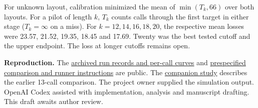 \documentclass[11pt,a4paper]{article}
\begin{document}
For unknown layout, calibration minimized the mean of $\min(T_k,66)$ over both
layouts. For a pilot of length $k$, $T_k$ counts calls through the first
target in either stage ($T_k=\infty$ on a miss). For $k=12,14,16,18,20$, the respective
mean losses were 23.57, 21.52, 19.35, 18.45 and 17.69. Twenty was the
best tested cutoff and the upper endpoint. The loss at longer cutoffs remains open.

{\footnotesize\smallskip
\textbf{Reproduction.} The \href{https://github.com/kummahiih/variational-quantum-algorithms/tree/cf6758371ddac34910474ade050eb5357326376f/results/handoff}{archived run records and per-call curves}
and \href{https://github.com/kummahiih/variational-quantum-algorithms/blob/8c4acad88fc133a4b9d4ece7675024ae7a4ad767/paper/handoff/README.md}{prespecified comparison and runner instructions} are public.
The \href{https://github.com/kummahiih/variational-quantum-algorithms/tree/a3444d4b071942ead4f008fb10b61a61e7449a4c/paper/clusters}{companion study} describes the earlier 13-call comparison.
The project owner supplied the simulation output. OpenAI Codex assisted with
implementation, analysis and manuscript drafting. This draft awaits author review.\par}
\end{document}
